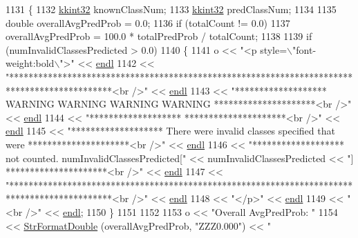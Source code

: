 \begin{DoxyCode}
1131 \{
1132   \hyperlink{namespace_k_k_b_a8fa4952cc84fda1de4bec1fbdd8d5b1b}{kkint32} knownClassNum;
1133   \hyperlink{namespace_k_k_b_a8fa4952cc84fda1de4bec1fbdd8d5b1b}{kkint32} predClassNum;
1134 
1135   \textcolor{keywordtype}{double}  overallAvgPredProb = 0.0;
1136   \textcolor{keywordflow}{if}  (totalCount != 0.0)
1137     overallAvgPredProb = 100.0 * totalPredProb / totalCount;
1138 
1139   \textcolor{keywordflow}{if}  (numInvalidClassesPredicted > 0.0)
1140   \{
1141     o << \textcolor{stringliteral}{"<p style=\(\backslash\)"font-weight:bold\(\backslash\)">"} << \hyperlink{namespace_k_k_b_ad1f50f65af6adc8fa9e6f62d007818a8}{endl} 
1142       << \textcolor{stringliteral}{"*********************************************************************************************<br
       />"}  << \hyperlink{namespace_k_k_b_ad1f50f65af6adc8fa9e6f62d007818a8}{endl}
1143       << \textcolor{stringliteral}{"*******************        WARNING    WARNING   WARNING   WARNING       *********************<br
       />"}  << \hyperlink{namespace_k_k_b_ad1f50f65af6adc8fa9e6f62d007818a8}{endl}
1144       << \textcolor{stringliteral}{"*******************                                                     *********************<br
       />"}  << \hyperlink{namespace_k_k_b_ad1f50f65af6adc8fa9e6f62d007818a8}{endl}
1145       << \textcolor{stringliteral}{"*******************   There were invalid classes specified that were    *********************<br
       />"}  << \hyperlink{namespace_k_k_b_ad1f50f65af6adc8fa9e6f62d007818a8}{endl}
1146       << \textcolor{stringliteral}{"*******************   not counted.    numInvalidClassesPredicted["} << numInvalidClassesPredicted 
      << \textcolor{stringliteral}{"] *********************<br />"} << \hyperlink{namespace_k_k_b_ad1f50f65af6adc8fa9e6f62d007818a8}{endl}
1147       << \textcolor{stringliteral}{"*********************************************************************************************<br
       />"}  << \hyperlink{namespace_k_k_b_ad1f50f65af6adc8fa9e6f62d007818a8}{endl}
1148       << \textcolor{stringliteral}{"</p>"}   << \hyperlink{namespace_k_k_b_ad1f50f65af6adc8fa9e6f62d007818a8}{endl}
1149       << \textcolor{stringliteral}{"<br />"} << \hyperlink{namespace_k_k_b_ad1f50f65af6adc8fa9e6f62d007818a8}{endl};
1150   \}
1151 
1152 
1153   o << \textcolor{stringliteral}{"Overall AvgPredProb: "} 
1154     << \hyperlink{namespace_k_k_b_a1a40a40e955fa5417a7cdd990e0021b1}{StrFormatDouble} (overallAvgPredProb, \textcolor{stringliteral}{"ZZZ0.000"}) << \textcolor{stringliteral}{"%
}
\end{DoxyCode}
